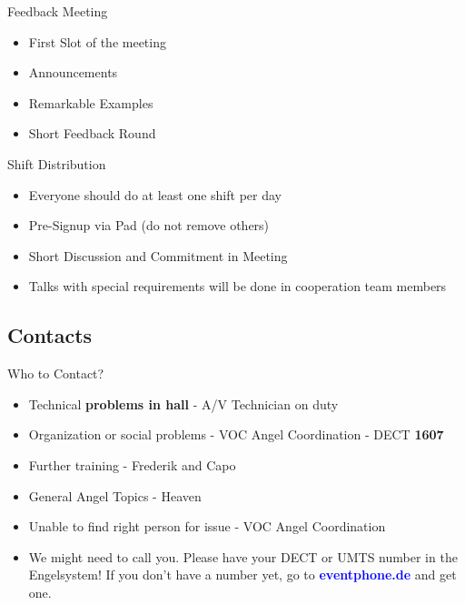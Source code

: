 \documentclass[hyperref={pdfpagelabels=false},aspectratio=169]{beamer}
\begin{document}
\begin{frame}{Feedback Meeting}
\begin{itemize}
	\item First Slot of the meeting %
	\item Announcements
	\item Remarkable Examples
	\item Short Feedback Round 
\end{itemize} 
\end{frame}

\begin{frame}{Shift Distribution}
\begin{itemize}
	\item Everyone should do at least one shift per day
	\item Pre-Signup via Pad (do not remove others)
	\item Short Discussion and Commitment in Meeting
	\item Talks with special requirements will be done in cooperation team members
\end{itemize} 
\end{frame}


\subsection{Contacts}
\begin{frame}{Who to Contact?}
\begin{itemize}
\item Technical \textbf{problems in hall} - A/V Technician on duty
\item Organization or social problems - VOC Angel Coordination - DECT \textbf{1607}
\item Further training - Frederik and Capo
\item General Angel Topics - Heaven
\item Unable to find right person for issue - VOC Angel Coordination
\item We might need to call you. Please have your DECT or UMTS number in the Engelsystem! If you don't have a number yet, go to 
\textcolor{blue}{\textbf{eventphone.de}} and get one. 
\end{itemize} 
\end{frame}


\end{document}
